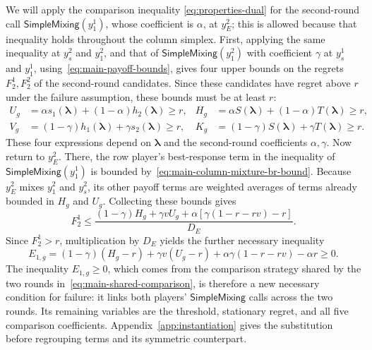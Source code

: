 \documentclass[11pt]{article}
\theoremstyle{remark}
\theoremstyle{plain}
\newcommand{\sm}{\mathsf{SimpleMixing}}
\begin{document}
We will apply the comparison inequality
\eqref{eq:properties-dual} for the second-round call
$\sm(y_1^1)$, whose coefficient is $\alpha$, at $y_E^2$; this is
allowed because that inequality holds throughout the column simplex.
First, applying the same inequality at $y_s^2$ and $y_1^2$, and that
of $\sm(y_1^2)$ with coefficient $\gamma$ at $y_s^1$ and $y_1^1$,
using~\eqref{eq:main-payoff-bounds}, gives four upper bounds on the
regrets $F_2^1,F_2^2$ of the second-round candidates. Since these
candidates have regret above
$r$ under the failure assumption, these bounds must be at least $r$:
\begin{equation}
 \begin{aligned}
 U_g&=\alpha s_1(\boldsymbol\lambda)+(1-\alpha)h_2(\boldsymbol\lambda)\ge r,&
 H_g&=\alpha S(\boldsymbol\lambda)+(1-\alpha)T(\boldsymbol\lambda)\ge r,\\
 V_g&=(1-\gamma)h_1(\boldsymbol\lambda)+\gamma s_2(\boldsymbol\lambda)\ge r,&
 K_g&=(1-\gamma)S(\boldsymbol\lambda)+\gamma T(\boldsymbol\lambda)\ge r.
 \end{aligned}
 \label{eq:main-weighted-regret-bounds}
\end{equation}
These four expressions depend on $\boldsymbol\lambda$ and the
second-round coefficients $\alpha,\gamma$.
Now return to $y_E^2$. There, the row player's best-response term in
the inequality of $\sm(y_1^1)$ is bounded
by~\eqref{eq:main-column-mixture-br-bound}.
Because $y_E^2$ mixes $y_1^2$ and $y_s^2$, its other payoff terms
are weighted averages of terms already bounded in $H_g$ and $U_g$.
Collecting these bounds gives
\begin{equation}
 F_2^1\le
 \frac{(1-\gamma)H_g+\gamma vU_g
       +\alpha[\gamma(1-r-rv)-r]}{D_E}.
 \label{eq:main-mixture-dual-bound}
\end{equation}
Since $F_2^1>r$, multiplication by $D_E$ yields the further
necessary inequality
\begin{equation}
 E_{1,g}=(1-\gamma)(H_g-r)+\gamma v(U_g-r)
               +\alpha\gamma(1-r-rv)-\alpha r\ge0.
 \label{eq:main-shared-coupling}
\end{equation}
The inequality $E_{1,g}\ge0$, which comes from the comparison strategy
shared by the two rounds in~\eqref{eq:main-shared-comparison}, is
therefore a new necessary condition for failure: it links both
players' $\sm$ calls across the two rounds. Its remaining variables are the threshold,
stationary regret, and all five comparison coefficients.
Appendix~\ref{app:instantiation} gives
the substitution before regrouping terms and its symmetric counterpart.
\end{document}

